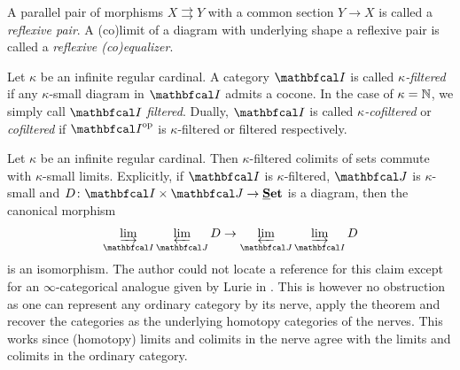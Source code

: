 \begin{definition}
	A parallel pair of morphisms $X\rightrightarrows Y$ with a common section $Y\to X$ is called a \emph{reflexive pair}. A (co)limit of a diagram with underlying shape a reflexive pair is called a \emph{reflexive (co)equalizer}.
\end{definition}

\begin{definition}[Filteredness]
	Let $\kappa$ be an infinite regular cardinal. A category $\category I$ is called \emph{$\kappa$-filtered} if any $\kappa$-small diagram in $\category I$ admits a cocone. In the case of $\kappa={\mathbb{N}}$, we simply call $\category I$ \emph{filtered}. Dually, $\category I$ is called \emph{$\kappa$-cofiltered} or \emph{cofiltered} if $\category I^\op$ is $\kappa$-filtered or filtered respectively.
\end{definition}

\begin{remark}
	\label{remark: interaction of filtered colimits and limits}
	Let $\kappa$ be an infinite regular cardinal. Then $\kappa$-filtered colimits of sets commute with $\kappa$-small limits. Explicitly, if $\category I$ is $\kappa$-filtered, $\category J$ is $\kappa$-small and $D\colon \category I\times\category J \to \Set$ is a diagram, then the canonical morphism
		$$\colimit_\category I \limit_\category J D \to \limit_\category J \colimit_\category I D$$
	is an isomorphism. The author could not locate a reference for this claim except for an $\infty$-categorical analogue given by Lurie in \cite[Prop. 5.3.3.3]{higher-topoi}. This is however no obstruction as one can represent any ordinary category by its nerve, apply the theorem and recover the categories as the underlying homotopy categories of the nerves. This works since (homotopy) limits and colimits in the nerve agree with the limits and colimits in the ordinary category.
\end{remark}

%	
%	

